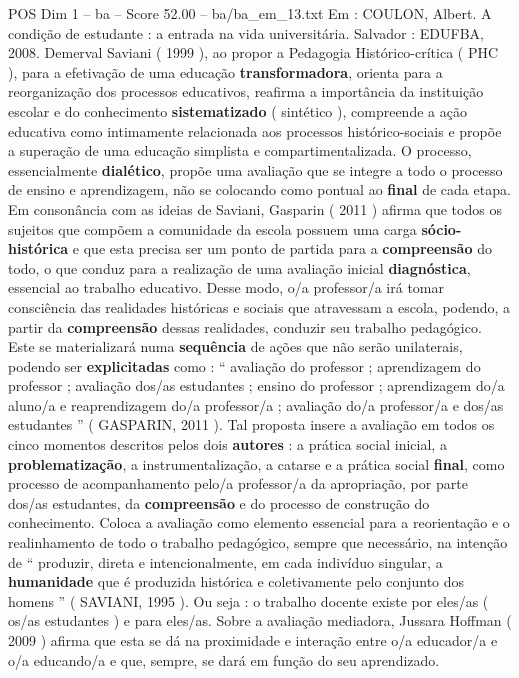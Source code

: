 \begin{textsample}{POS Dim 1 – ba – Score 52.00 – ba/ba\_em\_13.txt}
Em : COULON, Albert.
A condição de estudante : a entrada na vida universitária.
Salvador : EDUFBA, 2008.
Demerval Saviani ( 1999 ), ao propor a Pedagogia Histórico-crítica ( PHC ), para a efetivação de uma educação \textbf{transformadora}, orienta para a reorganização dos processos educativos, reafirma a importância da instituição escolar e do conhecimento \textbf{sistematizado} ( sintético ), compreende a ação educativa como intimamente relacionada aos processos histórico-sociais e propõe a superação de uma educação simplista e compartimentalizada.
O processo, essencialmente \textbf{dialético}, propõe uma avaliação que se integre a todo o processo de ensino e aprendizagem, não se colocando como pontual ao \textbf{final} de cada etapa.
Em consonância com as ideias de Saviani, Gasparin ( 2011 ) afirma que todos os sujeitos que compõem a comunidade da escola possuem uma carga \textbf{sócio-histórica} e que esta precisa ser um ponto de partida para a \textbf{compreensão} do todo, o que conduz para a realização de uma avaliação inicial \textbf{diagnóstica}, essencial ao trabalho educativo.
Desse modo, o/a professor/a irá tomar consciência das realidades históricas e sociais que atravessam a escola, podendo, a partir da \textbf{compreensão} dessas realidades, conduzir seu trabalho pedagógico.
Este se materializará numa \textbf{sequência} de ações que não serão unilaterais, podendo ser \textbf{explicitadas} como : “ avaliação do professor ; aprendizagem do professor ; avaliação dos/as estudantes ; ensino do professor ; aprendizagem do/a aluno/a e reaprendizagem do/a professor/a ; avaliação do/a professor/a e dos/as estudantes ” ( GASPARIN, 2011 ).
Tal proposta insere a avaliação em todos os cinco momentos descritos pelos dois \textbf{autores} : a prática social inicial, a \textbf{problematização}, a instrumentalização, a catarse e a prática social \textbf{final}, como processo de acompanhamento pelo/a professor/a da apropriação, por parte dos/as estudantes, da \textbf{compreensão} e do processo de construção do conhecimento.
Coloca a avaliação como elemento essencial para a reorientação e o realinhamento de todo o trabalho pedagógico, sempre que necessário, na intenção de “ produzir, direta e intencionalmente, em cada indivíduo singular, a \textbf{humanidade} que é produzida histórica e coletivamente pelo conjunto dos homens ” ( SAVIANI, 1995 ).
Ou seja : o trabalho docente existe por eles/as ( os/as estudantes ) e para eles/as.
Sobre a avaliação mediadora, Jussara Hoffman ( 2009 ) afirma que esta se dá na proximidade e interação entre o/a educador/a e o/a educando/a e que, sempre, se dará em função do seu aprendizado.

\end{textsample}
